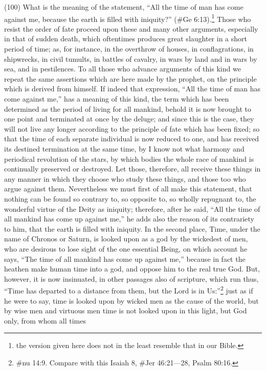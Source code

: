 (100) What is the meaning of the statement, ``All the time of man has come against me, because
the earth is filled with iniquity?'' (\#Ge 6:13).\footnote{the version given here does not in the least resemble that
in our Bible.} Those who resist the order of fate proceed upon these and many other arguments,
especially in that of sudden death, which oftentimes produces great slaughter in a short period of
time; as, for instance, in the overthrow of houses, in conflagrations, in shipwrecks, in civil tumults,
in battles of cavalry, in wars by land and in wars by sea, and in pestilences. To all those who
advance arguments of this kind we repeat the same assertions which are here made by the
prophet, on the principle which is derived from himself. If indeed that expression, ``All the time of
man has come against me,'' has a meaning of this kind, the term which has been determined as
the period of living for all mankind, behold it is now brought to one point and terminated at once by
the deluge; and since this is the case, they will not live any longer according to the principle of fate
which has been fixed; so that the time of each separate individual is now reduced to one, and has
received its destined termination at the same time, by I know not what harmony and periodical
revolution of the stars, by which bodies the whole race of mankind is continually preserved or
destroyed. Let those, therefore, all receive these things in any manner in which they choose who
study these things, and those too who argue against them. Nevertheless we must first of all make
this statement, that nothing can be found so contrary to, so opposite to, so wholly repugnant to, the
wonderful virtue of the Deity as iniquity; therefore, after he said, ``All the time of all mankind has
come up against me,'' he adds also the reason of its contrariety to him, that the earth is filled with
iniquity. In the second place, Time, under the name of Chronos or Saturn, is looked upon as a god
by the wickedest of men, who are desirous to lose sight of the one essential Being, on which
account he says, ``The time of all mankind has come up against me,'' because in fact the heathen
make human time into a god, and oppose him to the real true God. But, however, it is now
insinuated, in other passages also of scripture, which run thus, ``Time has departed to a distance
from them, but the Lord is in Us:''\footnote{\#nu 14:9. Compare with this Isaiah 8, \#Jer 46:21—28, Psalm
80:16.} just as if he were to say, time is looked upon by wicked men as the cause of the world, but by
wise men and virtuous men time is not looked upon in this light, but God only, from whom all times
